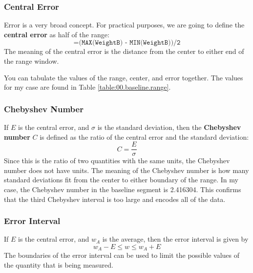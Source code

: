 \subsubsection{Central Error}
Error is a very broad concept. For practical purposes, we are going to define the \textbf{central error} as half of the range:
\begin{equation}
    \texttt{=(MAX(WeightB) - MIN(WeightB))/2}
\end{equation}
The meaning of the central error is the distance from the center to either end of the range window.

You can tabulate the values of the range, center, and error together. The values for my case are found in Table \ref{table:00.baseline.range}.
\subsubsection{Chebyshev Number}
If $E$ is the central error, and $\sigma$ is the standard deviation, then the \textbf{Chebyshev number} $C$ is defined as the ratio of the central error and the standard deviation:
\begin{equation}
    C = \frac{E}{\sigma}
\end{equation}
Since this is the ratio of two quantities with the same units, the Chebyshev number does not have units. The meaning of the Chebyshev number is how many standard deviations fit from the center to either boundary of the range. In my case, the Chebyshev number in the baseline segment is 2.416304. This confirms that the third Chebyshev interval is too large and encodes all of the data.
\subsubsection{Error Interval}
If $E$ is the central error, and $w_{A}$ is the average, then the error interval is given by
\begin{equation}
    w_{A} - E \leq w \leq w_{A} + E
\end{equation}
The boundaries of the error interval can be used to limit the possible values of the quantity that is being measured.

